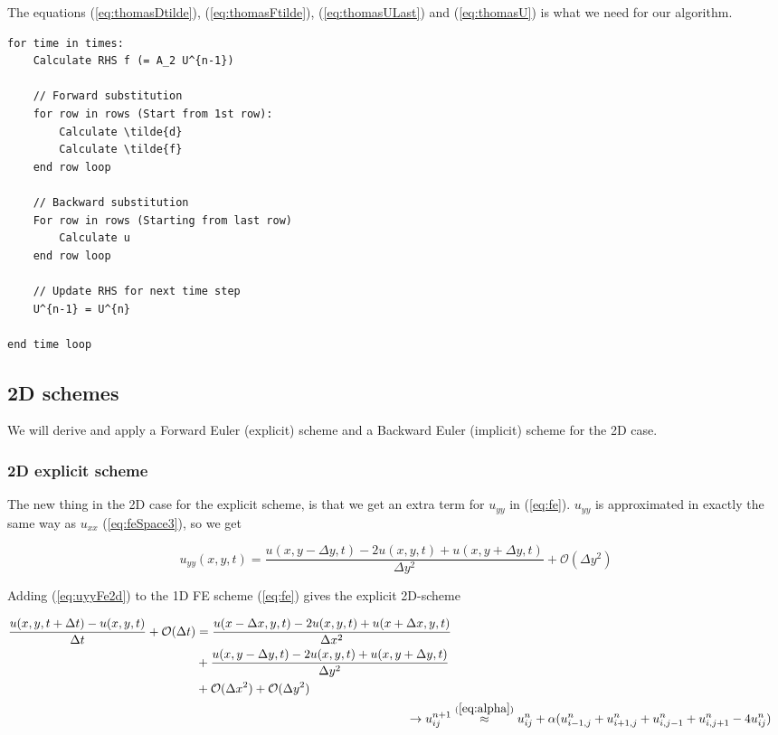 \documentclass{article}
\begin{document}
The equations (\ref{eq:thomasDtilde}), (\ref{eq:thomasFtilde}), (\ref{eq:thomasULast}) and (\ref{eq:thomasU}) is what we need for our algorithm.

\begin{lstlisting}
for time in times:
	Calculate RHS f (= A_2 U^{n-1})
	
	// Forward substitution
	for row in rows (Start from 1st row):
		Calculate \tilde{d}
		Calculate \tilde{f}
	end row loop
	
	// Backward substitution
	For row in rows (Starting from last row)
		Calculate u
	end row loop

	// Update RHS for next time step
	U^{n-1} = U^{n}

end time loop
\end{lstlisting}

\subsection{2D schemes}
We will derive and apply a Forward Euler (explicit) scheme and a Backward Euler (implicit) scheme for the 2D case.

\subsubsection{2D explicit scheme}
The new thing in the 2D case for the explicit scheme, is that we get an extra term for $u_{yy}$ in (\ref{eq:fe}). $u_{yy}$ is approximated in exactly the same way as $u_{xx}$ (\ref{eq:feSpace3}), so we get

\begin{equation}
	 u_{yy}(x,y,t) = \frac{u(x,y - \Delta y, t) - 2u(x,y,t) + u(x,y+ \Delta y, t)}{\Delta y^2} + \mathcal{O}(\Delta y^2)\label{eq:uyyFe2d}
\end{equation}

Adding (\ref{eq:uyyFe2d}) to the 1D FE scheme (\ref{eq:fe}) gives the explicit 2D-scheme

\begin{subequations}
	\begin{align}
		\begin{split}
			\frac{u(x,y, t+ \Delta t) - u(x,y,t)}{\Delta t} + \mathcal{O}(\Delta t) &= 
			\frac{u(x - \Delta x, y,t) - 2u(x,y,t) + u(x+ \Delta x,y, t)}{\Delta x^2} \\
			&+  \frac{u(x,y - \Delta y, t) - 2u(x,y,t) + u(x,y+ \Delta y, t)}{\Delta y^2} \\
			&+ \mathcal{O}(\Delta x^2)  + \mathcal{O}(\Delta y^2)
		\end{split}\\
		\rightarrow u_{ij}^{n+1} &\stackrel{(\ref{eq:alpha})}{\approx} u_{ij}^{n} + \alpha (u_{i-1,j}^n + u_{i+1,j}^n + u_{i,j-1}^n + u_{i,j+1}^n - 4u_{ij}^n)\label{eq:Fe2d}
	\end{align}
\end{subequations}
\end{document}
